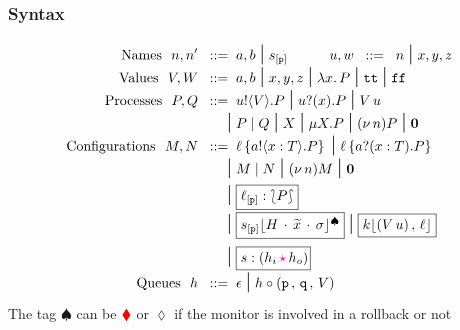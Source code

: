 \documentclass[12pt]{beamer}
\newcommand{\sessionfont}[1]{\mathtt{#1}}
\newcommand{\typeIn}[2]{#1\inptype ( #2)}
\newcommand{\inptype}{\inpses}
\newcommand{\bkcolor}[1]{\textcolor{red}{#1}}
\newcommand{\sepcolor}[1]{\textcolor{magenta}{#1}}
\newcommand{\news}[1]{(\nu\, #1)}
\newcommand{\queue}[1]{\lfloor #1 \rfloor}
\newcommand{\store}{\sigma}
\newcommand{\mysepp}{\,\cdot\,}
\newcommand{\true}{\sessionfont{tt}}
\newcommand{\false}{\sessionfont{ff}}
\newcommand{\mem}[3]{\ensuremath{#1\queue{#2\mysep #3}}}
\newcommand{\mytilde}[1]{\widetilde{#1}}
\newcommand{\mytagg}{\spadesuit}
\newcommand{\codah}[4]{\coda{#1}{(#2\,\history\,#3)\!#4}}
\newcommand{\history}{\sepcolor{\mathbf{\star}}}
\newcommand{\coda}[2]{#1:#2}
\newcommand{\lend}{\mathsf{end}}
\newcommand{\gpart}[1]{\mathtt{#1}}
\newcommand{\monig}[4]{\ensuremath{{#1\queue{\textcolor{black}{#2}\mysepp #3\mysepp #4}^{\mytagg}}}}
\newcommand{\bnfis}{\;\;::=\;\;}
\def\sbnfbar{\;\mbox{\Large{$\mid$}}\;}
\newcommand{\past}{\,\text{\textcolor{red}{\textbf{\textasciicircum}}}\,}
\newcommand{\conf}[2]{\lbag #2 \rbag} %
\newcommand{\stack}[1]{\mathtt{#1}}
\newcommand{\dual}[1]{\overline{#1}}
\newcommand{\abs}[2]{\lambda #1.\,#2}
\newcommand{\outses}{!}
\newcommand{\inpses}{?}
\newcommand{\rvar}[1]{#1}
\newcommand{\outtype}{\outses}
\newcommand{\typeOut}[2]{#1\outtype \langle #2\rangle}
\newcommand{\Par}{\;|\;}
\newcommand{\emp}{\epsilon}
\newcommand{\valueq}[3]{(#1 \,,\, #2 \,,\,#3)}
\newcommand{\freev}[1]{\langle #1\rangle}
\newcommand{\boundv}[1]{(#1)}
\newcommand{\shsep}{.}
\newcommand{\cons}{\circ}
\newcommand{\recp}[2]{\mu \rvar{#1}. #2}
\newcommand{\appl}[2]{#1\, {#2}}
\newcommand{\bout}[2]{#1 \outses \freev{#2} \shsep}
\newcommand{\binp}[2]{#1 \inpses \boundv{#2} \shsep}
\newcommand{\p}{\ensuremath{\mathtt{p}}\xspace}
\newcommand{\q}{\ensuremath{\mathtt{q}}\xspace}
\newcommand{\np}[2]{#1:#2}
\newcommand{\ep}[2]{#1_{[#2]}}
\newcommand{\mysep}{\,,\,}
\newcommand{\myloc}[2]{#1\left\{#2\right\}}
\newcommand{\loc}{\ell}
\newcommand{\rtsyn}[1]{\fcolorbox{black}{white}{\ensuremath{#1}}}
\newcommand{\rmark}{\bkcolor{\blacklozenge}}
\newcommand{\normark}{\lozenge}
\newcommand{\inact}{\mathbf{0}}
\begin{document}
\begin{frame}
	\frametitle{Syntax}
	\vspace{-9mm}
		\begin{align*}
\text{Names}~~ 					n,n' \bnfis & a,b \sbnfbar \ep{s}{\p}%
\qquad \quad
u,w  \bnfis n \sbnfbar x,y,z			
\\[-2mm]
	\text{Values}~~		V,W \bnfis & {a,b} \sbnfbar  x,y,z\sbnfbar {\abs{x}{P}}  \sbnfbar  \true \sbnfbar \false %
			\\[-2mm]
	\text{Processes}~~			P,Q
			 \bnfis &
			\bout{u}{V}{P}  \sbnfbar  \binp{u}{x}{P} 	\sbnfbar  
			 {\appl{V}{u}}  
			 \\[-2mm]
			  \sbnfbar & P \Par Q \sbnfbar  {\rvar{X} \sbnfbar \recp{X}{P}} 
			\sbnfbar \news{n} P \sbnfbar \inact
\\[-2mm]
\text{Configurations}~~M,N		 \bnfis &
\myloc{\loc}{\bout{a}{x:T}{P}}
\sbnfbar 
\myloc{\loc}{\binp{a}{x:T}{P}}
\\[-2mm]
\sbnfbar & 
M \Par N 
\sbnfbar 
\news{n} M
\sbnfbar 
\inact 
\\[-1mm]
 \sbnfbar &
\rtsyn{\np{\ep{\loc}{\p}}{\conf{\stack C}{P}}} %
\\[-1mm]
\sbnfbar &
\rtsyn{\monig{\ep{s}{\p}}{H}{\mytilde{x}}{\store}}  %
\sbnfbar 
\rtsyn{\mem{k}{(\appl{V}{u})}{\loc}} %
\\
 \sbnfbar &
\rtsyn{\codah{s}{h_i}{h_o}%
} %
	  \\[-1.5mm]
\text{Queues}~~	 h \bnfis &  \emp   \sbnfbar h \cons \valueq{\p}{\q}{V}%
%
\end{align*}
The tag $\mytagg$ can be $\rmark$ or $\normark$ if the monitor is involved in a rollback or not
\end{frame}
\end{document}
